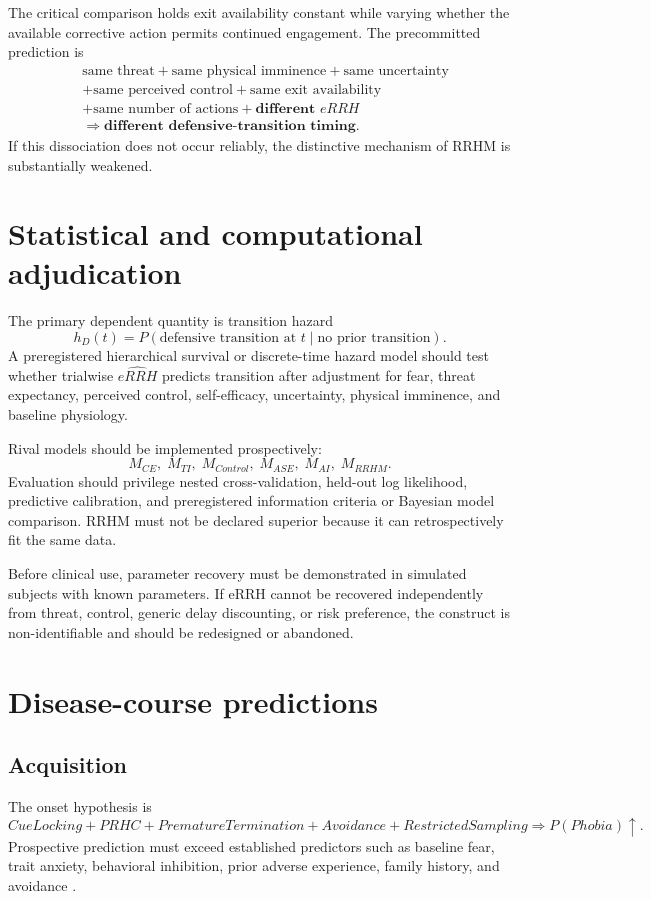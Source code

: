 \documentclass[9pt,twocolumn]{article}
\begin{document}
The critical comparison holds exit availability constant while varying whether the available corrective action permits continued engagement. The precommitted prediction is
\[
\boxed{
\begin{aligned}
&\text{same threat} + \text{same physical imminence} + \text{same uncertainty}\\
&+\text{same perceived control} + \text{same exit availability}\\
&+\text{same number of actions} + \textbf{different }eRRH\\
&\Rightarrow \textbf{different defensive-transition timing}.
\end{aligned}}
\]
If this dissociation does not occur reliably, the distinctive mechanism of RRHM is substantially weakened.

\section{Statistical and computational adjudication}
The primary dependent quantity is transition hazard
\[
h_D(t)=P(\text{defensive transition at }t\mid\text{no prior transition}).
\]
A preregistered hierarchical survival or discrete-time hazard model should test whether trialwise $\widehat{eRRH}$ predicts transition after adjustment for fear, threat expectancy, perceived control, self-efficacy, uncertainty, physical imminence, and baseline physiology.

Rival models should be implemented prospectively:
\[
M_{CE},\;M_{TI},\;M_{Control},\;M_{ASE},\;M_{AI},\;M_{RRHM}.
\]
Evaluation should privilege nested cross-validation, held-out log likelihood, predictive calibration, and preregistered information criteria or Bayesian model comparison. RRHM must not be declared superior because it can retrospectively fit the same data.

Before clinical use, parameter recovery must be demonstrated in simulated subjects with known parameters. If eRRH cannot be recovered independently from threat, control, generic delay discounting, or risk preference, the construct is non-identifiable and should be redesigned or abandoned.

\section{Disease-course predictions}
\subsection{Acquisition}
The onset hypothesis is
\[
CueLocking+PRHC+PrematureTermination+Avoidance+RestrictedSampling
\Rightarrow P(Phobia)\uparrow.
\]
Prospective prediction must exceed established predictors such as baseline fear, trait anxiety, behavioral inhibition, prior adverse experience, family history, and avoidance \cite{trumpf2010incidence}.
\end{document}
